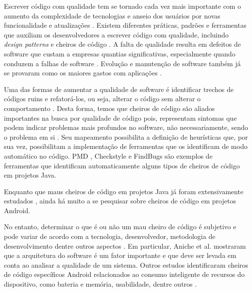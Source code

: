 Escrever código com qualidade tem se tornado cada vez mais importante com o aumento da complexidade de tecnologias e anseio dos usuários por novas funcionalidade e atualizações \cite{Hecht2015,MobileSmells:13}. Existem diferentes práticas, padrões e ferramentas que auxiliam os desenvolvedores a escrever código com qualidade, incluindo \textit{design patterns} \cite{gof} e cheiros de código \cite{Refactoring:99}. A falta de qualidade resulta em defeitos de software que custam a empresas quantias significativas, especialmente quando conduzem a falhas de software \cite{Nagappan:2005, briand1993modeling}. Evolução e manutenção de software também já se provaram como os maiores gastos com aplicações \cite{RefactoringAndImprovements:10}.

Uma das formas de aumentar a qualidade de software é identificar trechos de códigos ruins e refatorá-los, ou seja, alterar o código sem alterar o comportamento \cite{Refactoring:99}. Desta forma, temos que cheiros de código são aliados importantes na busca por qualidade de código pois, representam sintomas que podem indicar problemas mais profundos no software, não necessariamente, sendo o problema em si \cite{CodeSmell:06}. Seu mapeamento possibilita a definição de heurísticas que, por sua vez, possibilitam a implementação de ferramentas que os identificam de modo automático no código. PMD \cite{PMD2016}, Checkstyle e FindBugs são exemplos de ferramentas que identificam automaticamente alguns tipos de cheiros de código em projetos Java.


Enquanto que maus cheiros de código em projetos Java já foram extensivamente estudados \cite{Riel, Refactoring:99, Martin:2008:CCH:1388398}, ainda há muito a se pesquisar sobre cheiros de código em projetos Android.


No entanto, determinar o que é ou não um mau cheiro de código é subjetivo e pode variar de acordo com a tecnologia, desenvolvedor, metodologia de desenvolvimento dentre outros aspectos \cite{WikiCodeSmell}. Em particular, Aniche et al. \cite{MvcSmells:16,aniche2016satt} mostraram que a arquitetura do software é um fator importante e que deve ser levada em conta ao analisar a qualidade de um sistema.
Outros estudos identificaram cheiros de código específicos Android relacionados ao consumo inteligente de recursos do dispositivo, como bateria e memória, usabilidade, dentre outros \cite{EnergyAndroidSmells, ReimannBrylski2013}. 

